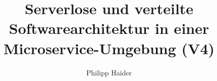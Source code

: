 \documentclass[master,german]{hgbthesis}
\title{Serverlose und verteilte Softwarearchitektur in einer Microservice-Umgebung (V4)}
\author{Philipp Haider}
\begin{document}

\frontmatter                    %

\maketitle
\tableofcontents

%		
%			

\mainmatter          %






%

\appendix                                            %


\MakeBibliography                        %

%

\end{document}
